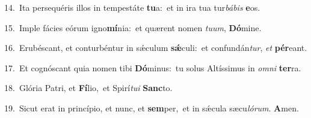 {\numbfont\textcolor{\numbcolor}{14.}}~Ita persequéris illos in tempestáte \textbf{tu}\-a:~\star et in ira tua tur\-\textit{bá}\-\textit{bis} \textbf{e}\-os.\par
{\numbfont\textcolor{\numbcolor}{15.}}~Imple fácies eórum igno\-\textbf{mí}\-nia:~\star et quærent nomen \textit{tu}\-\textit{um}, \textbf{Dó}\-mine.\par
{\numbfont\textcolor{\numbcolor}{16.}}~Erubéscant, et conturbéntur in sǽculum \textbf{sǽ}\-culi:~\star et confundán\-\textit{tur}\-, \textit{et} \textbf{pér}\-eant.\par
{\numbfont\textcolor{\numbcolor}{17.}}~Et cognóscant quia nomen tibi \textbf{Dó}\-minus:~\star tu solus Altíssimus in \textit{om}\-\textit{ni} \textbf{ter}\-ra.\par
{\numbfont\textcolor{\numbcolor}{18.}}~Glória Patri, et \textbf{Fí}\-lio,~\star et Spirí\-\textit{tu}\-\textit{i} \textbf{Sanc}\-to.\par
{\numbfont\textcolor{\numbcolor}{19.}}~Sicut erat in princípio, et nunc, et \textbf{sem}\-per,~\star et in sǽcula sæcu\-\textit{ló}\-\textit{rum}. \textbf{A}\-men.\par
